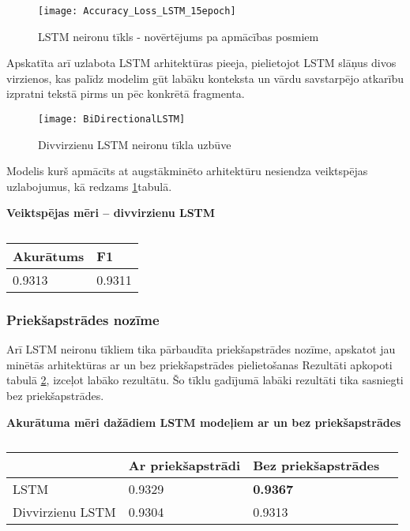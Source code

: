 \begin{figure}[H]
\texttt{[image: Accuracy\_Loss\_LSTM\_15epoch]}
\caption{LSTM neironu tīkls - novērtējums pa apmācības posmiem}
\label{fig:Accuracy_Loss_LSTM_15epoch}
\end{figure}

Apskatīta arī uzlabota LSTM arhitektūras pieeja, pielietojot LSTM slāņus divos virzienos, kas palīdz modelim gūt labāku konteksta un vārdu savstarpējo atkarību izpratni tekstā pirms un pēc konkrētā fragmenta.

\begin{figure}[H]
\centering
\texttt{[image: BiDirectionalLSTM]}
\caption{Divvirzienu LSTM neironu tīkla uzbūve}
\label{fig:BiDirectionalLSTM}
\end{figure}

Modelis kurš apmācīts at augstākminēto arhitektūru nesiendza veiktspējas uzlabojumus, kā redzams \ref{tab:score_bilstm}tabulā.

\begin{table}[H]
\centering
\caption{\label{tab:score_bilstm}}
\textbf{Veiktspējas mēri – divvirzienu LSTM\\}
\begin{tabular}{|l|l|}
\hline
Akurātums & F1 \\ \hline
0.9313 & 0.9311 \\ \hline
\end{tabular}
\end{table}

\subsubsection{Priekšapstrādes nozīme}

Arī LSTM neironu tīkliem tika pārbaudīta priekšapstrādes nozīme, apskatot jau minētās arhitektūras ar un bez priekšapstrādes pielietošanas Rezultāti apkopoti tabulā \ref{tab:accuracy_all_LSTM}, izceļot labāko rezultātu. Šo tīklu gadījumā labāki rezultāti tika sasniegti bez priekšapstrādes.

\begin{table}[H]
\centering
\caption{\label{tab:accuracy_all_LSTM}}
\textbf{Akurātuma mēri dažādiem LSTM modeļiem ar un bez priekšapstrādes\\}
\begin{tabular}{|l|l|l|l|}
\hline
& Ar priekšapstrādi & Bez priekšapstrādes \\ \hline
LSTM &  0.9329 & \textbf{0.9367} \\ \hline
Divvirzienu LSTM & 0.9304 & 0.9313 \\ \hline 
\end{tabular}
\end{table}

